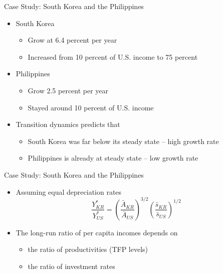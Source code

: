 \documentclass[aspectratio=1610]{beamer}
\begin{document}
\begin{frame}[wide]{Case Study: South Korea and the Philippines}
	\begin{itemize}
		\item South Korea
		\begin{itemize}
			\item Grow at 6.4 percent per year
			\item Increased from 10 percent of U.S. income to 75 percent
		\end{itemize}
		\item Philippines
		\begin{itemize}
			\item Grow 2.5 percent per year
			\item Stayed around 10 percent of U.S. income
		\end{itemize}
		\item Transition dynamics predicts that
		\begin{itemize}
			\item South Korea was far below its steady state -- high growth rate
			\item Philippines is already at steady state -- low growth rate
		\end{itemize}
	\end{itemize}
\end{frame}

\begin{frame}[wide]{Case Study: South Korea and the Philippines}
	\begin{itemize}
		\item Assuming equal depreciation rates
		\[\frac{Y^*_{KR}}{Y^*_{US}} = \left(\frac{\bar{A}_{KR}}{\bar{A}_{US}}\right)^{3/2} \left(\frac{\bar{s}_{KR}}{\bar{s}_{US}}\right)^{1/2} \]
		
		\vspace{2mm}
		\item The long-run ratio of per capita incomes depends on
		\begin{itemize}
			\item the ratio of productivities (TFP levels)
			\item the ratio of investment rates
		\end{itemize}
	\end{itemize}
\end{frame}
\end{document}
